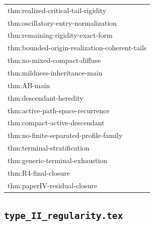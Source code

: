 \documentclass[11pt]{amsart}
\begin{document}
\begin{longtable}{@{}>{\ttfamily\footnotesize\raggedright\arraybackslash}p{}@{}}
thm:realized-critical-tail-rigidity\\
thm:oscillatory-entry-normalization\\
thm:remaining-rigidity-exact-form\\
thm:bounded-origin-realization-coherent-tails\\
thm:no-mixed-compact-diffuse\\
thm:mildness-inheritance-main\\
thm:AB-main\\
thm:descendant-heredity\\
thm:active-path-space-recurrence\\
thm:compact-active-descendant\\
thm:no-finite-separated-profile-family\\
thm:terminal-stratification\\
thm:generic-terminal-exhaustion\\
thm:R4-final-closure\\
thm:paperIV-residual-closure\\
\bottomrule
\end{longtable}

\subsection{\texorpdfstring{\texttt{type\_II\_regularity.tex}}{type II regularity.tex}}
\end{document}
